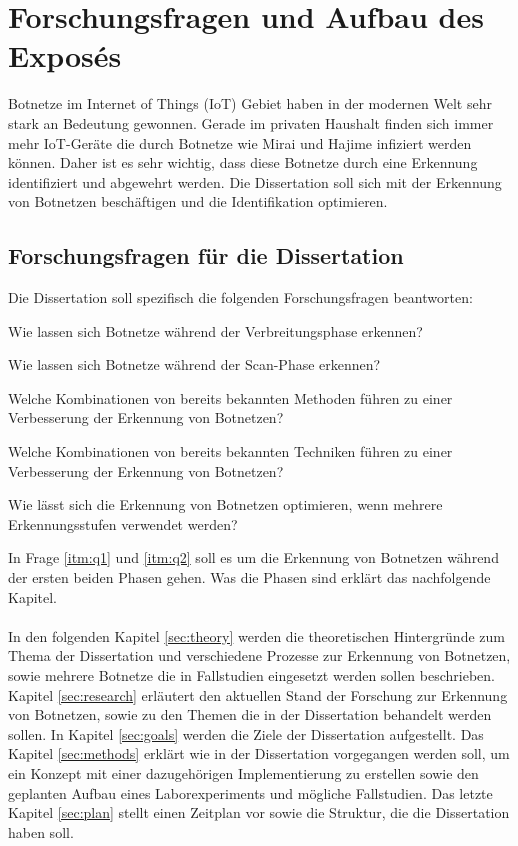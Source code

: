 \section{Forschungsfragen und Aufbau des Exposés}

Botnetze im Internet of Things (IoT) Gebiet haben in der modernen Welt sehr stark an Bedeutung gewonnen. Gerade im privaten 
Haushalt finden sich immer mehr IoT-Geräte die durch Botnetze wie Mirai und Hajime infiziert werden können. Daher ist es 
sehr wichtig, dass diese Botnetze durch eine Erkennung identifiziert und abgewehrt werden. Die Dissertation soll sich mit 
der Erkennung von Botnetzen beschäftigen und die Identifikation optimieren.

\subsection*{Forschungsfragen für die Dissertation}


Die Dissertation soll spezifisch die folgenden Forschungsfragen beantworten:  

\begin{questions}
    \item Wie lassen sich Botnetze während der Verbreitungsphase erkennen? \label{itm:q1}
    \item Wie lassen sich Botnetze während der Scan-Phase erkennen? \label{itm:q2}
    \item Welche Kombinationen von bereits bekannten Methoden führen zu einer Verbesserung der Erkennung von Botnetzen? \label{itm:q3}
    \item Welche Kombinationen von bereits bekannten Techniken führen zu einer Verbesserung der Erkennung von Botnetzen? \label{itm:q4}
    \item Wie lässt sich die Erkennung von Botnetzen optimieren, wenn mehrere Erkennungsstufen verwendet werden? \label{itm:q5}
\end{questions}

In Frage \ref{itm:q1} und \ref{itm:q2} soll es um die Erkennung von Botnetzen während der ersten beiden Phasen gehen. Was die Phasen sind erklärt das nachfolgende Kapitel. 
\\ \\
In den folgenden Kapitel \ref{sec:theory} werden die theoretischen Hintergründe zum Thema der Dissertation und verschiedene Prozesse zur Erkennung von Botnetzen, sowie 
mehrere Botnetze die in Fallstudien eingesetzt werden sollen beschrieben. Kapitel \ref{sec:research} erläutert den aktuellen Stand der Forschung zur Erkennung von Botnetzen,
sowie zu den Themen die in der Dissertation behandelt werden sollen. In Kapitel \ref{sec:goals} werden die Ziele der Dissertation aufgestellt. Das Kapitel \ref{sec:methods}
erklärt wie in der Dissertation vorgegangen werden soll, um ein Konzept mit einer dazugehörigen Implementierung zu erstellen sowie den geplanten Aufbau eines Laborexperiments
und mögliche Fallstudien. Das letzte Kapitel \ref{sec:plan} stellt einen Zeitplan vor sowie die Struktur, die die Dissertation haben soll.